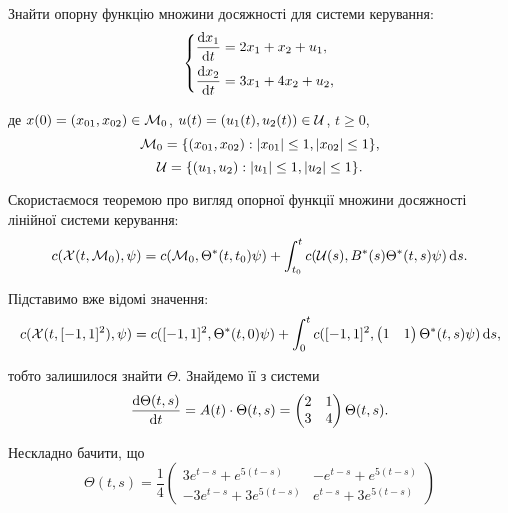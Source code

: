 \begin{problem}
	Знайти опорну функцію множини досяжності для системи керування: \[
	\left\{
		\begin{aligned}
			\frac{\mathop{}\!\mathrm{d} x_1}{\mathop{}\!\mathrm{d} t} &= 2x_1 + x_2 + u_1, \\
			\frac{\mathop{}\!\mathrm{d} x_2}{\mathop{}\!\mathrm{d} t} &= 3x_1 + 4x_2 + u_2,
		\end{aligned}
	\right.
	\]

	де $x (0) = (x_{01}, x_{02}) \in \mathcal{M}_0$, $u(t) = (u_1(t), u_2(t)) \in \mathcal{U}$, $t \ge 0$, \[ \mathcal{M}_0 = \{ (x_{01}, x_{02}): |x_{01}| \le 1, |x_{02}| \le 1 \}, \] \[ \mathcal{U} = \{(u_1, u_2): |u_1| \le 1, |u_2| \le 1\}. \]
\end{problem}

\begin{solution}
	Скористаємося теоремою про вигляд опорної функції множини досяжності лінійної системи керування: \[ c(\mathcal{X}(t, \mathcal{M}_0), \psi) = c(\mathcal{M}_0, \Theta^*(t, t_0) \psi) + \int_{t_0}^t c(\mathcal{U}(s), B^*(s) \Theta^*(t, s) \psi) \mathop{}\!\mathrm{d} s. \]

	Підставимо вже відомі значення: \[ c(\mathcal{X}(t, [-1,1]^2), \psi) = c([-1,1]^2, \Theta^*(t, 0) \psi) + \int_0^t c([-1,1]^2, \begin{pmatrix} 1 & 1 \end{pmatrix} \Theta^*(t, s) \psi) \mathop{}\!\mathrm{d} s, \] 

	тобто залишилося знайти $\Theta$. Знайдемо її з системи \[ \frac{\mathop{}\!\mathrm{d} \Theta(t, s)}{\mathop{}\!\mathrm{d} t} = A(t) \cdot \Theta(t, s) = \begin{pmatrix} 2 & 1 \\ 3 & 4 \end{pmatrix} \Theta(t, s). \]

	Нескладно бачити, що \[ \Theta(t, s) = \frac{1}{4}
	\begin{pmatrix}
		3 e^{t - s} + e^{5 (t - s)} & - e^{t - s} + e^{5 (t - s)} \\ -3 e^{t - s} + 3 e^{5 (t - s)} & e^{t - s} + 3 e^{5 (t - s)}
	\end{pmatrix} 
	\]


\end{solution}

